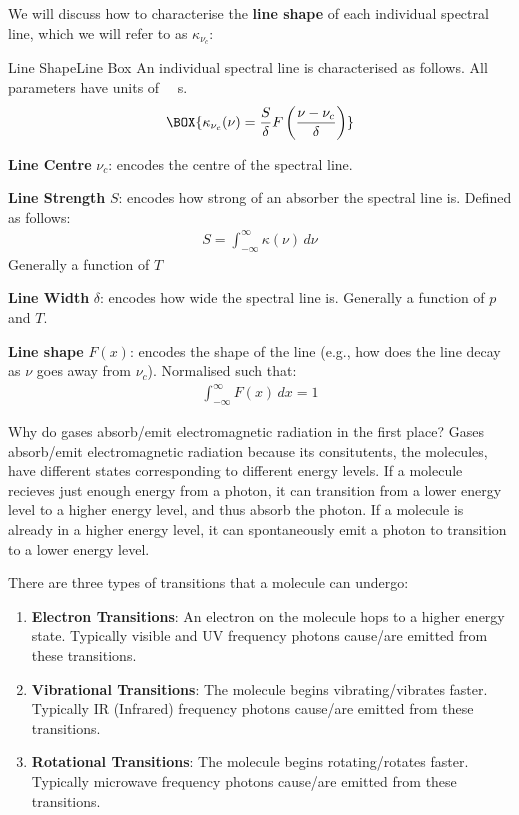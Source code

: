 We will discuss how to characterise the \textbf{line shape} of each individual spectral line, which we will refer to as $\kappa_{\nu_c}$: 
\begin{fact}{Line Shape}{Line Box}\label{Line Box}
    An individual spectral line is characterised as follows. All parameters have units of \qty{}{\per\second}.
    \begin{align}
        \BOX{\kappa_{\nu_c}(\nu)=\frac{S}{\delta}F\left( \frac{\nu-\nu_c}{\delta} \right)}
    \end{align}
    \begin{minipage}{.48\linewidth}
        \textbf{Line Centre} $\nu_c$:
        encodes the centre of the spectral line.

        \vspace{5 mm}
        \textbf{Line Strength} $S$: encodes how strong of an absorber the spectral line is. Defined as follows:
        \begin{align}\label{Strength}
            S=\int_{-\infty}^{\infty}\kappa(\nu)\,d\nu
        \end{align}
        Generally a function of $T$
    \end{minipage}
    \hfill
    \begin{minipage}{.48\linewidth}
        \textbf{Line Width} $\delta$:
        encodes how wide the spectral line is. Generally a function of $p$ and $T$.
        
        \vspace{5 mm}
        \textbf{Line shape} $F(x)$: encodes the shape of the line (e.g., how does the line decay as $\nu$ goes away from $\nu_c$). Normalised such that:
        \begin{align*}
            \int_{-\infty}^{\infty}F(x)\,dx=1
        \end{align*}
    \end{minipage}
\end{fact}
Why do gases absorb/emit electromagnetic radiation in the first place? Gases absorb/emit electromagnetic radiation because its consitutents, the molecules, have different states corresponding to different energy levels. If a molecule recieves just enough energy from a photon, it can transition from a lower energy level to a higher energy level, and thus absorb the photon. If a molecule is already in a higher energy level, it can spontaneously emit a photon to transition to a lower energy level.

There are three types of transitions that a molecule can undergo:
\begin{enumerate}
    \item \textbf{Electron Transitions}: An electron on the molecule hops to a higher energy state. Typically visible and UV frequency photons cause/are emitted from these transitions.
    \item \textbf{Vibrational Transitions}: The molecule begins vibrating/vibrates faster. Typically IR (Infrared) frequency photons cause/are emitted from these transitions.
    \item \textbf{Rotational Transitions}: The molecule begins rotating/rotates faster. Typically microwave frequency photons cause/are emitted from these transitions.
\end{enumerate}

